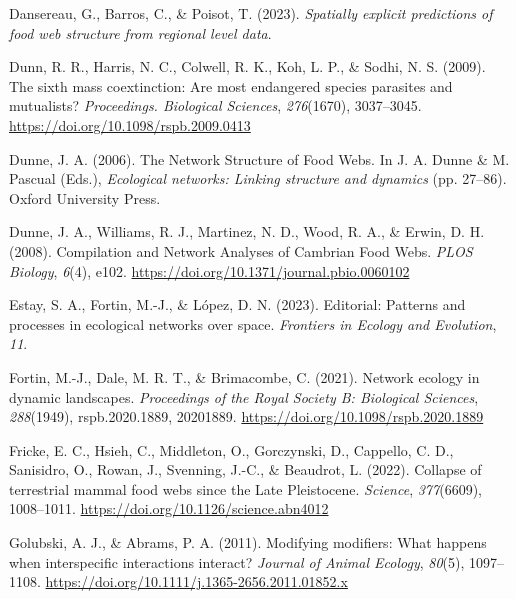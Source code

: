 \documentclass[
]{article}
\newlength{\cslhangindent}
\newenvironment{CSLReferences}[2] %
 {\begin{list}{}{%
  \setlength{\itemindent}{0pt}
  \setlength{\leftmargin}{0pt}
  \setlength{\parsep}{0pt}
  \ifodd #1
   \setlength{\leftmargin}{\cslhangindent}
   \setlength{\itemindent}{-1\cslhangindent}
  \fi
  \setlength{\itemsep}{#2\baselineskip}}}
 {\end{list}}
\begin{document}
\begin{CSLReferences}{1}{0}
Dansereau, G., Barros, C., \& Poisot, T. (2023). \emph{Spatially
explicit predictions of food web structure from regional level data}.

Dunn, R. R., Harris, N. C., Colwell, R. K., Koh, L. P., \& Sodhi, N. S.
(2009). The sixth mass coextinction: Are most endangered species
parasites and mutualists? \emph{Proceedings. Biological Sciences},
\emph{276}(1670), 3037--3045.
\url{https://doi.org/10.1098/rspb.2009.0413}

Dunne, J. A. (2006). The {Network Structure} of {Food Webs}. In J. A.
Dunne \& M. Pascual (Eds.), \emph{Ecological networks: {Linking}
structure and dynamics} (pp. 27--86). Oxford University Press.

Dunne, J. A., Williams, R. J., Martinez, N. D., Wood, R. A., \& Erwin,
D. H. (2008). Compilation and {Network Analyses} of {Cambrian Food
Webs}. \emph{PLOS Biology}, \emph{6}(4), e102.
\url{https://doi.org/10.1371/journal.pbio.0060102}

Estay, S. A., Fortin, M.-J., \& López, D. N. (2023). Editorial:
{Patterns} and processes in ecological networks over space.
\emph{Frontiers in Ecology and Evolution}, \emph{11}.

Fortin, M.-J., Dale, M. R. T., \& Brimacombe, C. (2021). Network ecology
in dynamic landscapes. \emph{Proceedings of the Royal Society B:
Biological Sciences}, \emph{288}(1949), rspb.2020.1889, 20201889.
\url{https://doi.org/10.1098/rspb.2020.1889}

Fricke, E. C., Hsieh, C., Middleton, O., Gorczynski, D., Cappello, C.
D., Sanisidro, O., Rowan, J., Svenning, J.-C., \& Beaudrot, L. (2022).
Collapse of terrestrial mammal food webs since the {Late Pleistocene}.
\emph{Science}, \emph{377}(6609), 1008--1011.
\url{https://doi.org/10.1126/science.abn4012}

Golubski, A. J., \& Abrams, P. A. (2011). Modifying modifiers: What
happens when interspecific interactions interact? \emph{Journal of
Animal Ecology}, \emph{80}(5), 1097--1108.
\url{https://doi.org/10.1111/j.1365-2656.2011.01852.x}


\end{CSLReferences}
\end{document}
